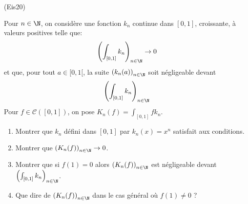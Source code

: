 \begin{tiny}(Eis20)\end{tiny} Pour $n\in \N$, on considère une fonction $k_n$ continue dans $[0,1]$, croissante, à valeurs positives telle que:
\begin{displaymath}
 \left( \int_{[0,1]}k_n\right)_{n\in \N} \rightarrow 0 
\end{displaymath}
et que, pour tout $a \in [0,1[$, la suite $\left( k_n(a)\right) _{n\in \N}$  soit négligeable devant
\begin{displaymath}
 \left( \int_{[0,1]}k_n\right)_{n\in \N}
\end{displaymath}
Pour $f\in\mathcal{C}([0,1])$, on pose $K_n(f) = \int_{[0,1]}fk_n$.
\begin{enumerate}
 \item Montrer que $k_n$ défini dans $[0,1]$ par $k_n(x)=x^n$ satisfait aux conditions.
 \item Montrer que $\left( K_n(f)\right) _{n\in \N}\rightarrow 0$.
 \item Montrer que si $f(1)=0$ alors $\left( K_n(f)\right) _{n\in \N}$ est négligeable devant $\left( \int_{[0,1]}k_n\right)_{n\in \N}$.
 \item Que dire de $\left( K_n(f)\right) _{n\in \N}$ dans le cas général où $f(1)\neq 0$ ?
\end{enumerate}
